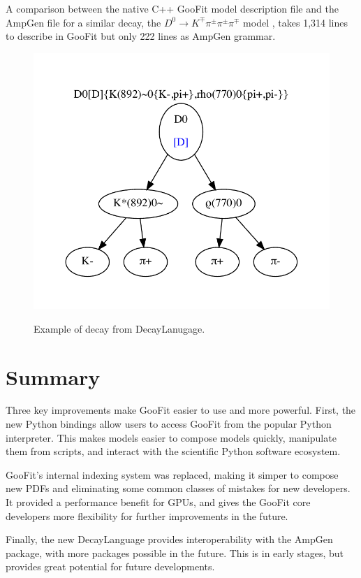 \documentclass{webofc}
\begin{document}
A comparison between the native C++ GooFit model description file and the AmpGen file for a similar decay, the  $D^0\rightarrow K^{\mp} \pi^{\pm} \pi^{\pm} \pi^{\mp}$ model \cite{paper:kthreepi}, takes 1,314 lines to describe in GooFit but only 222 lines as AmpGen grammar.

\begin{figure}[h]
	\includegraphics[width=.5\textwidth]{LineExample}
	\label{figure-ampgen}
	\caption{Example of decay from DecayLanugage.}
\end{figure}

\section{Summary}
\label{sec-summary}

Three key improvements make GooFit easier to use and more powerful. First, the new Python bindings allow users to access GooFit from the popular Python interpreter. This makes models easier to compose models quickly, manipulate them from scripts, and interact with the scientific Python software ecosystem.

GooFit's internal indexing system was replaced, making it simper to compose new PDFs and eliminating some common classes of mistakes for new developers. It provided a performance benefit for GPUs, and gives the GooFit core developers more flexibility for further improvements in the future.

Finally, the new DecayLanguage provides interoperability with the AmpGen package, with more packages possible in the future. This is in early stages, but provides great potential for future developments.

\end{document}
